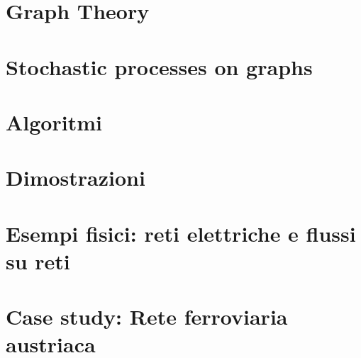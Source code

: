 \documentclass[10pt]{article}
\begin{document}
\section{Graph Theory}


\section{Stochastic processes on graphs}


\appendix
\section{Algoritmi}


\section{Dimostrazioni}

\section{Esempi fisici: reti elettriche e flussi su reti}
\section{Case study: Rete ferroviaria austriaca}

\printbibliography
\end{document}
